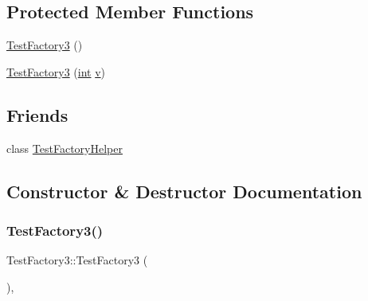 \subsection*{Protected Member Functions}
\begin{DoxyCompactItemize}
\item 
\mbox{\hyperlink{class_test_factory3_ac55b0f9842b155dec8906c08dd781e39}{Test\+Factory3}} ()
\item 
\mbox{\hyperlink{class_test_factory3_ad7b6df3d1fc174ccb2af52854abb0381}{Test\+Factory3}} (\mbox{\hyperlink{warnings_8h_a74f207b5aa4ba51c3a2ad59b219a423b}{int}} \mbox{\hyperlink{_s_d_l__opengl_8h_a10a82eabcb59d2fcd74acee063775f90}{v}})
\end{DoxyCompactItemize}
\subsection*{Friends}
\begin{DoxyCompactItemize}
\item 
class \mbox{\hyperlink{class_test_factory3_adc15c60543a15213908f8668bd10792b}{Test\+Factory\+Helper}}
\end{DoxyCompactItemize}


\subsection{Constructor \& Destructor Documentation}
\mbox{\label{class_test_factory3_ac55b0f9842b155dec8906c08dd781e39}} 
\subsubsection{\texorpdfstring{TestFactory3()}{TestFactory3()}\hspace{0.1cm}{\footnotesize\ttfamily [1/4]}}
{\footnotesize\ttfamily Test\+Factory3\+::\+Test\+Factory3 (\begin{DoxyParamCaption}{ }\end{DoxyParamCaption})\hspace{0.3cm}{\ttfamily [inline]}, {\ttfamily [protected]}}

\mbox{\label{class_test_factory3_ad7b6df3d1fc174ccb2af52854abb0381}} 
